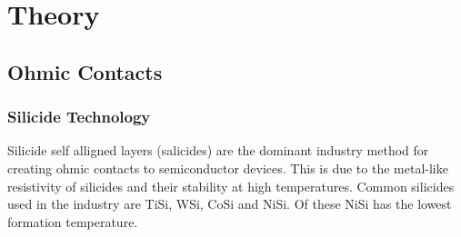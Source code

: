 
\chapter{Theory}

\section{Ohmic Contacts}

\subsection{Silicide Technology}

Silicide self alligned layers (salicides) are the dominant industry method for creating ohmic contacts to semiconductor devices. This is due to the metal-like resistivity of silicides and their stability at high temperatures. Common silicides used in the industry are TiSi, WSi, CoSi and NiSi. Of these NiSi has the lowest formation temperature.

\cleardoublepage